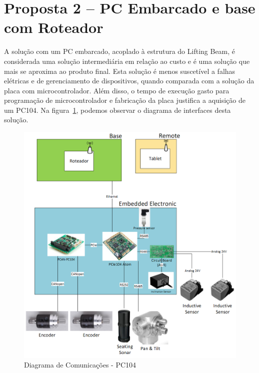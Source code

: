 


\section{Proposta 2 – PC Embarcado e base com Roteador}

A solução com um PC embarcado, acoplado à estrutura do Lifting Beam, é
considerada uma solução intermediária em relação ao custo e é uma solução que
mais se aproxima ao produto final. Esta solução é menos suscetível a falhas
elétricas e de gerenciamento de dispositivos, quando comparada com a solução da
placa com microcontrolador. Além disso, o tempo de execução gasto para programação de microcontrolador e fabricação da placa justifica a aquisição de um PC104. Na figura~\ref{pc104}, podemos observar o diagrama de interfaces desta solução.

\begin{figure}[H]
    \centering
    \includegraphics[width=1\columnwidth]{figs/eletronica/4.png}
    \caption{Diagrama de Comunicações - PC104}
    \label{pc104}
\end{figure} 
 
